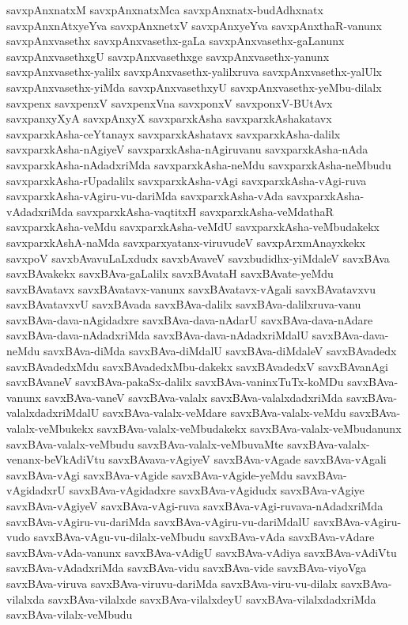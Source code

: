 {savxpAnxnatxM
savxpAnxnatxMca
savxpAnxnatx-budAdhxnatx
savxpAnxnAtxyeYva
savxpAnxnetxV
savxpAnxyeYva
savxpAnxthaR-vanunx
savxpAnxvasethx
savxpAnxvasethx-gaLa
savxpAnxvasethx-gaLanunx
savxpAnxvasethxgU
savxpAnxvasethxge
savxpAnxvasethx-yanunx
savxpAnxvasethx-yalilx
savxpAnxvasethx-yalilxruva
savxpAnxvasethx-yalUlx
savxpAnxvasethx-yiMda
savxpAnxvasethxyU
savxpAnxvasethx-yeMbu-dilalx
savxpenx
savxpenxV
savxpenxVna
savxponxV
savxponxV-BUtAvx
savxpanxyXyA
savxpAnxyX
savxparxkAsha
savxparxkAshakatavx
savxparxkAsha-ceYtanayx
savxparxkAshatavx
savxparxkAsha-dalilx
savxparxkAsha-nAgiyeV
savxparxkAsha-nAgiruvanu
savxparxkAsha-nAda
savxparxkAsha-nAdadxriMda
savxparxkAsha-neMdu
savxparxkAsha-neMbudu
savxparxkAsha-rUpadalilx
savxparxkAsha-vAgi
savxparxkAsha-vAgi-ruva
savxparxkAsha-vAgiru-vu-dariMda
savxparxkAsha-vAda
savxparxkAsha-vAdadxriMda
savxparxkAsha-vaqtitxH
savxparxkAsha-veMdathaR
savxparxkAsha-veMdu
savxparxkAsha-veMdU
savxparxkAsha-veMbudakekx
savxparxkAshA-naMda
savxparxyatanx-viruvudeV
savxpArxmAnayxkekx
savxpoV
savxbAvavuLaLxdudx
savxbAvaveV
savxbudidhx-yiMdaleV
savxBAva
savxBAvakekx
savxBAva-gaLalilx
savxBAvataH
savxBAvate-yeMdu
savxBAvatavx
savxBAvatavx-vanunx
savxBAvatavx-vAgali
savxBAvatavxvu
savxBAvatavxvU
savxBAvada
savxBAva-dalilx
savxBAva-dalilxruva-vanu
savxBAva-dava-nAgidadxre
savxBAva-dava-nAdarU
savxBAva-dava-nAdare
savxBAva-dava-nAdadxriMda
savxBAva-dava-nAdadxriMdalU
savxBAva-dava-neMdu
savxBAva-diMda
savxBAva-diMdalU
savxBAva-diMdaleV
savxBAvadedx
savxBAvadedxMdu
savxBAvadedxMbu-dakekx
savxBAvadedxV
savxBAvanAgi
savxBAvaneV
savxBAva-pakaSx-dalilx
savxBAva-vaninxTuTx-koMDu
savxBAva-vanunx
savxBAva-vaneV
savxBAva-valalx
savxBAva-valalxdadxriMda
savxBAva-valalxdadxriMdalU
savxBAva-valalx-veMdare
savxBAva-valalx-veMdu
savxBAva-valalx-veMbukekx
savxBAva-valalx-veMbudakekx
savxBAva-valalx-veMbudanunx
savxBAva-valalx-veMbudu
savxBAva-valalx-veMbuvaMte
savxBAva-valalx-venanx-beVkAdiVtu
savxBAvava-vAgiyeV
savxBAva-vAgade
savxBAva-vAgali
savxBAva-vAgi
savxBAva-vAgide
savxBAva-vAgide-yeMdu
savxBAva-vAgidadxrU
savxBAva-vAgidadxre
savxBAva-vAgidudx
savxBAva-vAgiye
savxBAva-vAgiyeV
savxBAva-vAgi-ruva
savxBAva-vAgi-ruvava-nAdadxriMda
savxBAva-vAgiru-vu-dariMda
savxBAva-vAgiru-vu-dariMdalU
savxBAva-vAgiru-vudo
savxBAva-vAgu-vu-dilalx-veMbudu
savxBAva-vAda
savxBAva-vAdare
savxBAva-vAda-vanunx
savxBAva-vAdigU
savxBAva-vAdiya
savxBAva-vAdiVtu
savxBAva-vAdadxriMda
savxBAva-vidu
savxBAva-vide
savxBAva-viyoVga
savxBAva-viruva
savxBAva-viruvu-dariMda
savxBAva-viru-vu-dilalx
savxBAva-vilalxda
savxBAva-vilalxde
savxBAva-vilalxdeyU
savxBAva-vilalxdadxriMda
savxBAva-vilalx-veMbudu
}
